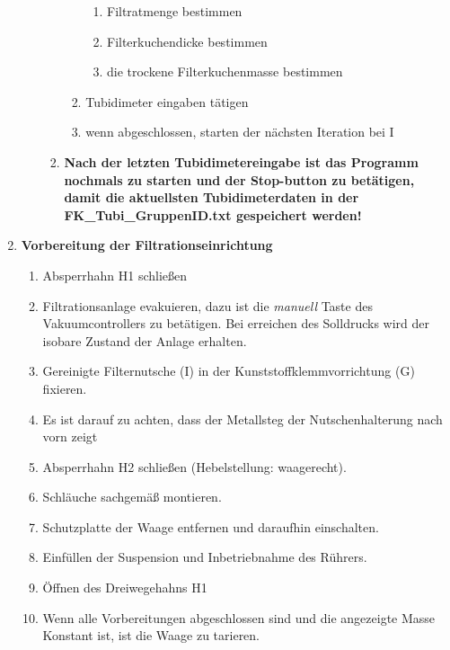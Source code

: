 \begin{enumerate}
\begin{itemize}
\begin{enumerate}[label = \Roman*]
\begin{enumerate}[label = --]
\begin{enumerate}[label = -]
				\item Filtratmenge bestimmen 
				\item Filterkuchendicke bestimmen 
				\item die trockene Filterkuchenmasse bestimmen
				\end{enumerate}
			\item Tubidimeter eingaben tätigen
			\item wenn abgeschlossen,  starten der nächsten Iteration bei I		 
			 \end{enumerate}
			\item \textbf{Nach der letzten Tubidimetereingabe ist das Programm nochmals zu starten und der Stop-button zu betätigen, damit die aktuellsten Tubidimeterdaten in der \newline FK\_Tubi\_{\Menlo GruppenID.txt} gespeichert werden!} 
		\end{enumerate}	
	\end{itemize}


\item \textbf{{\Hypatia Vorbereitung der Filtrationseinrichtung}}
	\begin{enumerate}[label = \alph*]
	\item Absperrhahn H1 schließen
	\item Filtrationsanlage evakuieren, dazu ist die \textit{manuell} Taste des Vakuumcontrollers zu betätigen. Bei erreichen des Solldrucks wird der isobare Zustand der Anlage erhalten.
 	\item Gereinigte Filternutsche ({\Hypatia I}) in der Kunststoffklemmvorrichtung ({\Hypatia G}) fixieren.
 	\item Es ist darauf zu achten, dass der Metallsteg der Nutschenhalterung nach vorn zeigt
	\item Absperrhahn H2 schließen (Hebelstellung: waagerecht).
	\item Schläuche sachgemäß montieren.
	\item Schutzplatte der Waage entfernen und daraufhin einschalten.	
	\item Einfüllen der Suspension und Inbetriebnahme des Rührers. 
	\item Öffnen des Dreiwegehahns H1
	\item Wenn alle Vorbereitungen abgeschlossen sind und die angezeigte Masse Konstant ist, ist die Waage zu tarieren.
	 \end{enumerate}	
\end{enumerate}

 


